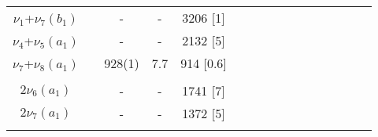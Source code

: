 \begin{landscape}
\begin{ThreePartTable}
\begin{longtable}{*{16}{c}}
        $\nu_{1}$+$\nu_{7}(b_1)$ & & -   &  -    & 3206 [1]\\
        $\nu_{4}$+$\nu_{5}(a_1)$ & & -   &  -    & 2132 [5]\\
        $\nu_{7}$+$\nu_{8}(a_1)$ & &928(1)& 7.7 & 914 [0.6]\\\\
        $2\nu_{6}(a_1)$ &  & - & -& 1741 [7]\\
        $2\nu_{7}(a_1)$ &  & - & -& 1372 [5]\\\\
    \end{longtable}
\end{ThreePartTable}
\end{landscape}
\clearpage